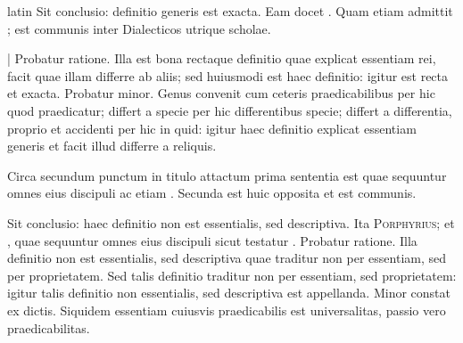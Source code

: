 \begin{otherlanguage*}{latin}
\pstart
  Sit conclusio: definitio generis est exacta. Eam docet . Quam etiam admittit ; est communis inter Dialecticos utrique scholae. 
\pend

\pstart
  \textnormal{|}   Probatur ratione. Illa est bona rectaque definitio quae explicat essentiam rei, facit quae illam differre ab aliis; sed huiusmodi est haec definitio: igitur est recta et exacta. Probatur minor. Genus convenit cum ceteris praedicabilibus per hic quod praedicatur; differt a specie per hic differentibus specie; differt a differentia, proprio et accidenti per hic in quid: igitur haec definitio explicat essentiam generis et facit illud differre a reliquis. 
\pend

\pstart
  Circa secundum punctum in titulo attactum prima sententia est  quae sequuntur omnes eius discipuli ac etiam . Secunda est huic opposita et est communis. 
\pend

\pstart
  Sit conclusio: haec definitio non est essentialis, sed descriptiva. Ita \textsc{Porphyrius};  et , quae sequuntur omnes eius discipuli sicut testatur . Probatur ratione. Illa definitio non est essentialis, sed descriptiva quae traditur non per essentiam, sed per proprietatem. Sed talis definitio traditur non per essentiam, sed proprietatem: igitur talis definitio non essentialis, sed descriptiva est appellanda. Minor constat ex dictis. Siquidem essentiam cuiusvis praedicabilis est universalitas, passio vero praedicabilitas. 
\pend


\end{otherlanguage*}
